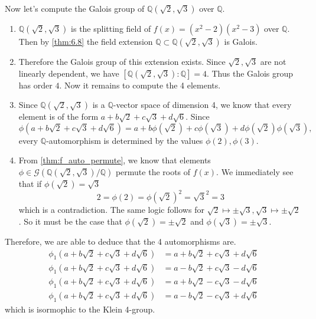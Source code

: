   \begin{example}
    Now let's compute the Galois group of $\mathbb{Q}(\sqrt{2}, \sqrt{3})$ over $\mathbb{Q}$. 
    \begin{enumerate}
      \item $\mathbb{Q}(\sqrt{2}, \sqrt{3})$ is the splitting field of $f(x) = (x^2 - 2)(x^2 - 3)$ over $\mathbb{Q}$. Then by \ref{thm:6.8} the field extension $\mathbb{Q} \subset \mathbb{Q}(\sqrt{2}, \sqrt{3})$ is Galois. 

      \item Therefore the Galois group of this extension exists. Since $\sqrt{2}, \sqrt{3}$ are not linearly dependent, we have $[\mathbb{Q}(\sqrt{2}, \sqrt{3}):\mathbb{Q}] = 4$. Thus the Galois group has order $4$. Now it remains to compute the 4 elements. 

      \item Since $\mathbb{Q}(\sqrt{2}, \sqrt{3})$ is a $\mathbb{Q}$-vector space of dimension 4, we know that every element is of the form $a + b \sqrt{2} + c \sqrt{3} + d \sqrt{6}$. Since 
      \begin{equation}
        \phi(a + b \sqrt{2} + c \sqrt{3} + d \sqrt{6}) = a + b \phi(\sqrt{2}) + c \phi(\sqrt{3}) + d \phi(\sqrt{2}) \phi(\sqrt{3}), 
      \end{equation}
      every $\mathbb{Q}$-automorphism is determined by the values $\phi(2), \phi(3)$. 

    \item From \ref{thm:f_auto_permute}, we know that elements $\phi \in \mathcal{G}(\mathbb{Q}(\sqrt{2}, \sqrt{3}) / \mathbb{Q})$ permute the roots of $f(x)$. We immediately see that if $\phi(\sqrt{2}) = \sqrt{3}$
      \begin{equation}
        2 = \phi(2) = \phi(\sqrt{2})^2 = \sqrt{3}^2 = 3
      \end{equation}
      which is a contradiction. The same logic follows for $\sqrt{2} \mapsto \pm \sqrt{3}, \sqrt{3} \mapsto \pm \sqrt{2}$. So it must be the case that $\phi(\sqrt{2}) = \pm \sqrt{2}$ and $\phi(\sqrt{3}) = \pm \sqrt{3}$. 
    \end{enumerate}
    Therefore, we are able to deduce that the 4 automorphisms are. 
    \begin{align}
      \phi_1 (a + b \sqrt{2} + c \sqrt{3} + d \sqrt{6}) & = a + b \sqrt{2} + c \sqrt{3} + d \sqrt{6} \\
      \phi_1 (a + b \sqrt{2} + c \sqrt{3} + d \sqrt{6}) & = a - b \sqrt{2} + c \sqrt{3} - d \sqrt{6} \\
      \phi_1 (a + b \sqrt{2} + c \sqrt{3} + d \sqrt{6}) & = a + b \sqrt{2} - c \sqrt{3} - d \sqrt{6} \\
      \phi_1 (a + b \sqrt{2} + c \sqrt{3} + d \sqrt{6}) & = a - b \sqrt{2} - c \sqrt{3} + d \sqrt{6}
    \end{align}
    which is isormophic to the Klein 4-group. 
  \end{example}


